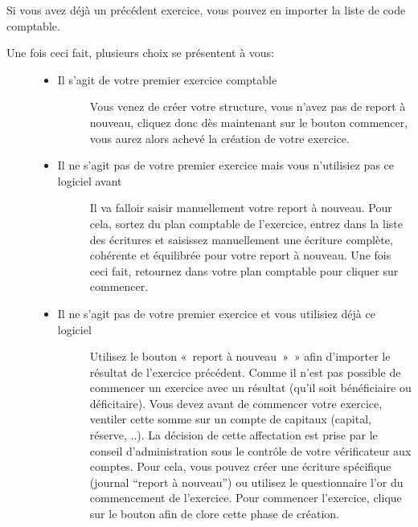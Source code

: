 \documentclass[a4paper,10pt,oneside,french]{sphinxmanual}
\begin{document}
Si vous avez déjà un précédent exercice, vous pouvez en importer la liste de code comptable.
\begin{description}
\item[{Une fois ceci fait, plusieurs choix se présentent à vous:}] \leavevmode\begin{itemize}
\item {} \begin{description}
\item[{Il s’agit de votre premier exercice comptable}] \leavevmode
Vous venez de créer votre structure, vous n’avez pas de report à nouveau, cliquez donc dès maintenant sur le bouton commencer, vous aurez alors achevé la création de votre exercice.

\end{description}

\item {} \begin{description}
\item[{Il ne s’agit pas de votre premier exercice mais vous n’utilisiez pas ce logiciel avant}] \leavevmode
Il va falloir saisir manuellement votre report à nouveau.
Pour cela, sortez du plan comptable de l’exercice, entrez dans la liste des écritures et saisissez manuellement une écriture complète, cohérente et équilibrée pour votre report à nouveau.
Une fois ceci fait, retournez dans votre plan comptable pour cliquer sur commencer.

\end{description}

\item {} \begin{description}
\item[{Il ne s’agit pas de votre premier exercice et vous utilisiez déjà ce logiciel}] \leavevmode
Utilisez le bouton « report à nouveau » » afin d’importer le résultat de l’exercice précédent.
Comme il n’est pas possible de commencer un exercice avec un résultat (qu’il soit bénéficiaire ou déficitaire).
Vous devez avant de commencer votre exercice, ventiler cette somme sur un compte de capitaux (capital, réserve, ..).
La décision de cette affectation est prise par le conseil d’administration sous le contrôle de votre vérificateur aux comptes.
Pour cela, vous pouvez créer une écriture spécifique (journal “report à nouveau”) ou utilisez le questionnaire l’or du commencement de l’exercice.
Pour commencer l’exercice, clique sur le bouton afin de clore cette phase de création.

\end{description}

\end{itemize}

\end{description}
\end{document}
